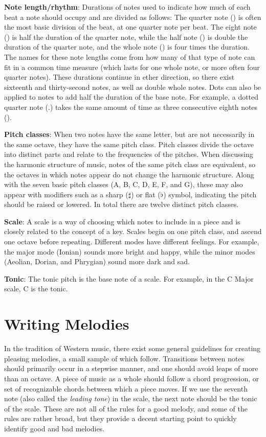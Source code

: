 \textbf{Note length/rhythm}: Durations of notes used to indicate how much of each beat a note should occupy and are divided as follows:
The quarter note (\quarternote) is often the most basic division of the beat, at one quarter note per beat.
The eight note (\eighthnote) is half the duration of the quarter note, while the half note (\halfnote) is double the duration of the quarter note, and the whole note (\fullnote) is four times the duration.
The names for these note lengths come from how many of that type of note can fit in a common time measure (which lasts for one whole note, or more often four quarter notes).
These durations continue in ether direction, so there exist sixteenth and thirty-second notes, as well as double whole notes.
Dots can also be applied to notes to add half the duration of the base note.
For example, a dotted quarter note (\quarternote.) takes the same amount of time as three consecutive eighth notes (\eighthnote \eighthnote \eighthnote).

\textbf{Pitch classes}: When two notes have the same letter, but are not necessarily in the same octave, they have the same pitch class.
Pitch classes divide the octave into distinct parts and relate to the frequencies of the pitches.
When discussing the harmonic structure of music, notes of the same pitch class are equivalent, so the octaves in which notes appear do not change the harmonic structure.
Along with the seven basic pitch classes (A, B, C, D, E, F, and G), these may also appear with modifiers such as a sharp ($\sharp$) or flat ($\flat$) symbol, indicating the pitch should be raised or lowered.
In total there are twelve distinct pitch classes.

\textbf{Scale}: A scale is a way of choosing which notes to include in a piece and is closely related to the concept of a key.
Scales begin on one pitch class, and ascend one octave before repeating.
Different modes have different feelings.
For example, the major mode (Ionian) sounds more bright and happy, while the minor modes (Aeolian, Dorian, and Phrygian) sound more dark and sad.

\textbf{Tonic}: The tonic pitch is the base note of a scale.
For example, in the C Major scale, C is the tonic.

\section{Writing Melodies} \label{bg:writingmelodies}

In the tradition of Western music, there exist some general guidelines for creating pleasing melodies, a small sample of which follow.
Transitions between notes should primarily occur in a stepwise manner, and one should avoid leaps of more than an octave.
A piece of music as a whole should follow a chord progression, or set of recognizable chords between which a piece moves.
If we use the seventh note (also called the \textit{leading tone}) in the scale, the next note should be the tonic of the scale.
These are not all of the rules for a good melody, and some of the rules are rather broad, but they provide a decent starting point to quickly identify good and bad melodies.

